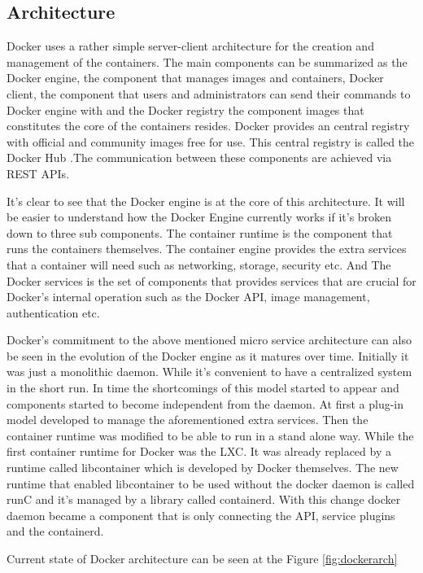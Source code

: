 \documentclass[12pt,oneandhalf,chaparabic,ceng,ms,eng,oneside,pntc]{gsufbe}
\begin{document}
\subsection{Architecture}
Docker uses a rather simple server-client architecture for the creation and management of the
containers. The main components can be summarized as the Docker engine, the component that manages
images and containers, Docker client, the component that users and administrators can send their
commands to Docker engine with and the Docker registry the component images that constitutes the core of
the containers resides. Docker provides an central registry with official and community images free for
use. This central registry is called the Docker Hub \cite{docker_hub}
.The communication between these components are achieved via REST APIs.

It's clear to see that the Docker engine is at the core of this architecture. It will be easier to
understand how the Docker Engine currently works if it's broken down to three sub components. The
container runtime is the component that runs the containers themselves. The container engine provides
the extra services that a container will need such as networking, storage, security etc. And The Docker 
services is the set of components that provides services that are crucial for Docker's internal
operation such as the Docker API, image management, authentication etc.

Docker's commitment to the above mentioned micro service architecture can also be seen in the evolution
of the Docker engine as it matures over time. Initially it was just a monolithic daemon. While it's
convenient to have a centralized system in the short run. In time the shortcomings of this model
started to appear and components started to become independent from the daemon. At first a plug-in
model developed to manage the aforementioned extra services. Then the container runtime was modified to
be able to run in a stand alone way. While the first container runtime for Docker was the LXC. It was
already replaced by a runtime called libcontainer which is developed by Docker themselves. The new
runtime that enabled libcontainer to be used without the docker daemon is called runC and it's managed
by a library called containerd. With this change docker daemon became a component that is only
connecting the API, service plugins and the containerd.

Current state of Docker architecture can be seen at the Figure \ref{fig:dockerarch}
\end{document}
